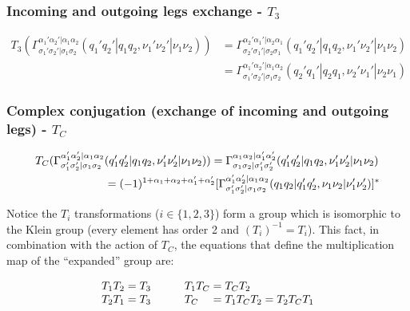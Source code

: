 \documentclass[12pt,a4paper,roman]{article}
\begin{document}
\subsubsection*{Incoming and outgoing legs exchange - $T_3$}
\begin{align}
    T_3 \left( \Gamma_{\sigma_1'\sigma_2'|\sigma_1\sigma_2}^{\alpha_1'\alpha_2'|\alpha_1\alpha_2}(q_1'q_2'|q_1q_2, \nu_1'\nu_2'|\nu_1\nu_2) \right) &= \Gamma_{\sigma_2'\sigma_1'|\sigma_2\sigma_1}^{\alpha_2'\alpha_1'|\alpha_2\alpha_1}(q_1'q_2'|q_1q_2, \nu_1'\nu_2'|\nu_1\nu_2)\\
    &= \Gamma_{\sigma_1'\sigma_2'|\sigma_1\sigma_2}^{\alpha_1'\alpha_2'|\alpha_1\alpha_2}(q_2'q_1'|q_2q_1, \nu_2'\nu_1'|\nu_2\nu_1)
    \label{eq:t3}
\end{align}

\subsubsection*{Complex conjugation (exchange of incoming and outgoing legs) - $T_C$}
\begin{align}
    T_C \large( \Gamma_{\sigma_1'\sigma_2'|\sigma_1\sigma_2}^{\alpha_1'\alpha_2'|\alpha_1\alpha_2}&(q_1'q_2'|q_1q_2, \nu_1'\nu_2'|\nu_1\nu_2) \large) = \Gamma_{\sigma_1\sigma_2|\sigma_1'\sigma_2'}^{\alpha_1\alpha_2|\alpha_1'\alpha_2'}(q_1'q_2'|q_1q_2, \nu_1'\nu_2'|\nu_1\nu_2)\\
    &=(-1)^{1+\alpha_1+\alpha_2+\alpha_1'+\alpha_2'}[ \Gamma_{\sigma_1'\sigma_2'|\sigma_1\sigma_2}^{\alpha_1'\alpha_2'|\alpha_1\alpha_2}(q_1q_2|q_1'q_2', \nu_1\nu_2|\nu_1'\nu_2')]^*
    \label{eq:tc}
\end{align}

Notice the $T_i$ transformations ($i\in \{1,2,3\}$) form a group which is isomorphic to the Klein group (every element has order 2 and $(T_i)^{-1} = T_i$). This fact, in combination with the action of $T_C$, the equations that define the multiplication map of the ``expanded'' group are:

\begin{align}
    \begin{array}{r@{\mskip\thickmuskip}l}
    T_1T_2 &= T_3\\
    T_2T_1 &= T_3
  \end{array} 
  \quad  \quad
  \begin{array}{l@{\mskip\thickmuskip}l}
    T_1T_C &= T_CT_2 \\
    T_C &= T_1T_CT_2 = T_2T_CT_1
  \end{array}
\end{align}
\end{document}
